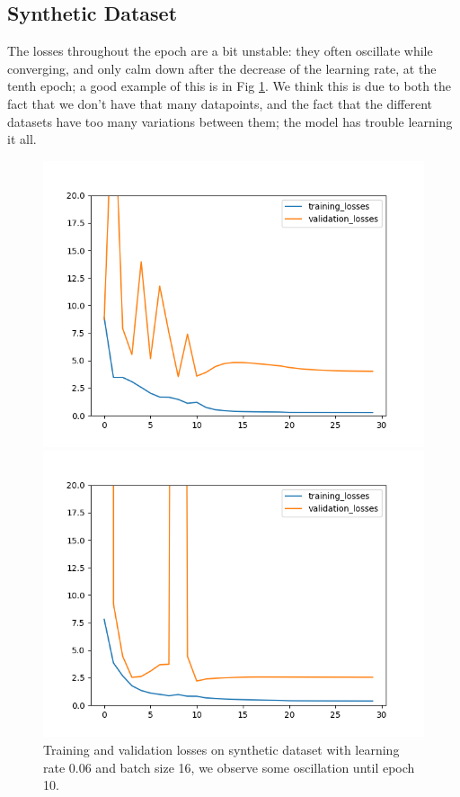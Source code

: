 \documentclass[10pt,conference]{IEEEtran}
\begin{document}
\subsection{Synthetic Dataset}
The losses throughout the epoch are a bit unstable: they often oscillate while converging, and only calm down after the decrease of the learning rate, at the tenth epoch; a good example of this is in Fig \ref{figure:oscillations}. We think this is due to both the fact that we don't have that many datapoints, and the fact that the different datasets have too many variations between them; the model has trouble learning it all. \par

\begin{figure}[h]
  \centering
  \begin{minipage}[h]{0.23\textwidth}
    \includegraphics[width=\textwidth]{images/oscillations.png}
    \caption{Training and validation losses on synthetic dataset with learning rate 0.06 and batch size 16, we observe some oscillation until epoch 10.}
    \label{figure:oscillations}
  \end{minipage}
  \hfill
  \begin{minipage}[h]{0.23\textwidth}
    \includegraphics[width=\textwidth]{images/example_high_lr.png}

\end{minipage}
\end{figure}
\end{document}
